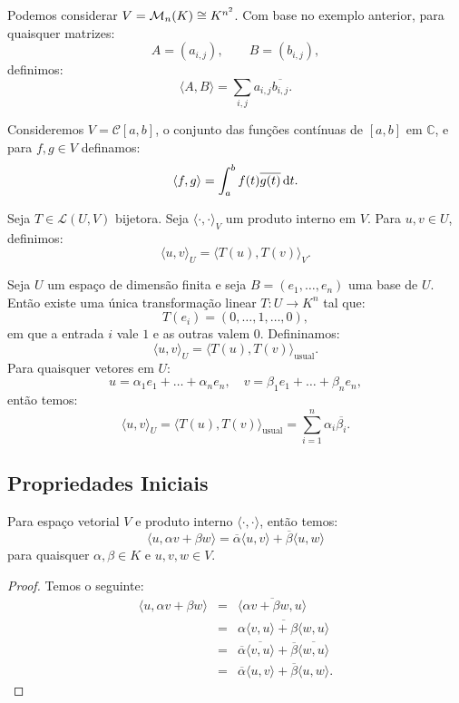 \documentclass[11pt,twoside,a4paper]{book}
\begin{document}
\begin{exemplo}
Podemos considerar $V=\mathcal{M}_{n}(K)\cong K^{n^2}$. Com base no exemplo anterior, para quaisquer matrizes:
\[
A=(a_{i,j}),\quad\quad B=(b_{i,j}),
\]
definimos:
\[
\langle A,B\rangle=\sum_{i,j}a_{i,j}\overline{b_{i,j}}.
\]
\end{exemplo}

\begin{exemplo}
Consideremos $V=\mathcal{C}[a,b]$, o conjunto das funções contínuas de $[a,b]$ em $\mathbb{C}$, e para $f,g\in V$ definamos:
\[
\langle f,g\rangle=\int_a^bf(t)\overline{g(t)}\dif t.
\]
\end{exemplo}

\begin{exemplo}
Seja $T\in\mathcal{L}(U,V)$ bijetora. Seja $\langle\cdot,\cdot\rangle_V$ um produto interno em $V$. Para $u,v\in U$, definimos:
\[
\langle u,v\rangle_U=\langle T(u),T(v)\rangle_V.
\]
\end{exemplo}

\begin{exemplo}
Seja $U$ um espaço de dimensão finita e seja $B=(e_1,\dots,e_n)$ uma base de $U$. Então existe uma única transformação linear $T:U\rightarrow K^n$ tal que:
\[
T(e_i)=(0,\dots,1,\dots,0),
\]
em que a entrada $i$ vale $1$ e as outras valem $0$. Defininamos:
\[
\langle u,v\rangle_U=\langle T(u),T(v)\rangle_{\text{usual}}.
\]
Para quaisquer vetores em $U$:
\[
u=\alpha_1e_1+\dots+\alpha_ne_n,\quad v=\beta_1e_1+\dots+\beta_ne_n,
\]
então temos:
\[
\langle u,v\rangle_U=\langle T(u),T(v)\rangle_{\text{usual}}=\sum_{i=1}^n\alpha_i\overline{\beta_i}.
\]
\end{exemplo}

\subsection{Propriedades Iniciais}

\begin{proposicao}
Para espaço vetorial $V$ e produto interno $\langle\cdot,\cdot\rangle$, então temos:
\[
\langle u,\alpha v+\beta w\rangle=\overline{\alpha}\langle u,v\rangle+\overline{\beta}\langle u,w\rangle
\]
para quaisquer $\alpha,\beta\in K$ e $u,v,w\in V$.
\end{proposicao}
\begin{proof}
Temos o seguinte:
\[
\begin{array}{rcl}
\langle u,\alpha v+\beta w\rangle&=&\overline{\langle \alpha v+\beta w,u\rangle}\\
&=&\overline{\alpha\langle v,u\rangle+\beta\langle w,u\rangle}\\
&=&\overline{\alpha}\overline{\langle v,u\rangle}+\overline{\beta}\overline{\langle w,u\rangle}\\
&=&\overline{\alpha}\langle u,v\rangle+\overline{\beta}\langle u,w\rangle.
\end{array}
\]
\end{proof}
\end{document}
